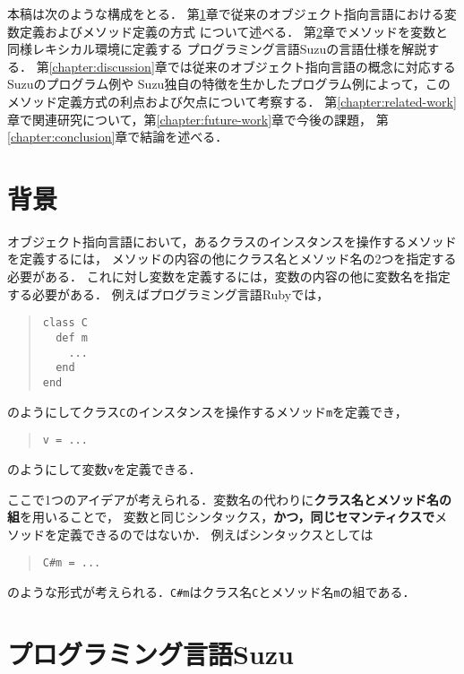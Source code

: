 \documentclass[a4paper,11pt,dvipdfmx]{jreport}
\begin{document}
本稿は次のような構成をとる．
第\ref{chapter:background}章で従来のオブジェクト指向言語における変数定義およびメソッド定義の方式
について述べる．
第\ref{chapter:implementation}章でメソッドを変数と同様レキシカル環境に定義する
プログラミング言語Suzuの言語仕様を解説する．
第\ref{chapter:discussion}章では従来のオブジェクト指向言語の概念に対応するSuzuのプログラム例や
Suzu独自の特徴を生かしたプログラム例によって，このメソッド定義方式の利点および欠点について考察する．
第\ref{chapter:related-work}章で関連研究について，第\ref{chapter:future-work}章で今後の課題，
第\ref{chapter:conclusion}章で結論を述べる．


\chapter{背景}
\label{chapter:background}

オブジェクト指向言語において，あるクラスのインスタンスを操作するメソッドを定義するには，
メソッドの内容の他にクラス名とメソッド名の2つを指定する必要がある．
これに対し変数を定義するには，変数の内容の他に変数名を指定する必要がある．
例えばプログラミング言語Rubyでは，
\begin{quote}
\begin{verbatim}
class C
  def m
    ...
  end
end
\end{verbatim}
\end{quote}
のようにしてクラス\verb|C|のインスタンスを操作するメソッド\verb|m|を定義でき，
\begin{quote}
\begin{verbatim}
v = ...
\end{verbatim}
\end{quote}
のようにして変数\verb|v|を定義できる．

ここで1つのアイデアが考えられる．変数名の代わりに\textbf{クラス名とメソッド名の組}を用いることで，
変数と同じシンタックス，\textbf{かつ，同じセマンティクスで}メソッドを定義できるのではないか．
例えばシンタックスとしては
\begin{quote}
\begin{verbatim}
C#m = ...
\end{verbatim}
\end{quote}
のような形式が考えられる．\verb|C#m|はクラス名\verb|C|とメソッド名\verb|m|の組である．


\chapter{プログラミング言語Suzu}
\label{chapter:implementation}
\end{document}
